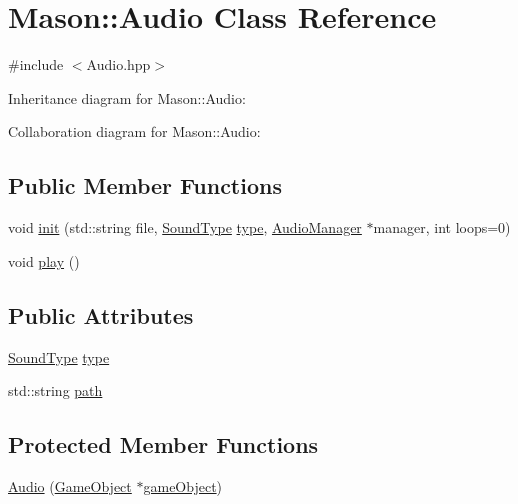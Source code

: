 \hypertarget{class_mason_1_1_audio}{}\section{Mason\+:\+:Audio Class Reference}
\label{class_mason_1_1_audio}


{\ttfamily \#include $<$Audio.\+hpp$>$}



Inheritance diagram for Mason\+:\+:Audio\+:


Collaboration diagram for Mason\+:\+:Audio\+:
\subsection*{Public Member Functions}
\begin{DoxyCompactItemize}
\item 
void \hyperlink{class_mason_1_1_audio_a5d4f318f5bee0b59d1a4289495b01b4c}{init} (std\+::string file, \hyperlink{namespace_mason_a158d651086d1ba1aacc4c37125b27657}{Sound\+Type} \hyperlink{class_mason_1_1_audio_a100d9da58685f865bf03dcf44a55fb63}{type}, \hyperlink{class_mason_1_1_audio_manager}{Audio\+Manager} $\ast$manager, int loops=0)
\item 
void \hyperlink{class_mason_1_1_audio_a2916f9015031bee9abb98adf0d83e7ee}{play} ()
\end{DoxyCompactItemize}
\subsection*{Public Attributes}
\begin{DoxyCompactItemize}
\item 
\hyperlink{namespace_mason_a158d651086d1ba1aacc4c37125b27657}{Sound\+Type} \hyperlink{class_mason_1_1_audio_a100d9da58685f865bf03dcf44a55fb63}{type}
\item 
std\+::string \hyperlink{class_mason_1_1_audio_a762cc6174ce20a011fe1e3a36e649204}{path}
\end{DoxyCompactItemize}
\subsection*{Protected Member Functions}
\begin{DoxyCompactItemize}
\item 
\hyperlink{class_mason_1_1_audio_a433e686e47efeff747a71a847e8ae83a}{Audio} (\hyperlink{class_mason_1_1_game_object}{Game\+Object} $\ast$\hyperlink{class_mason_1_1_component_a30030370c35f5562cbbbb0927b0448c8}{game\+Object})
\end{DoxyCompactItemize}
